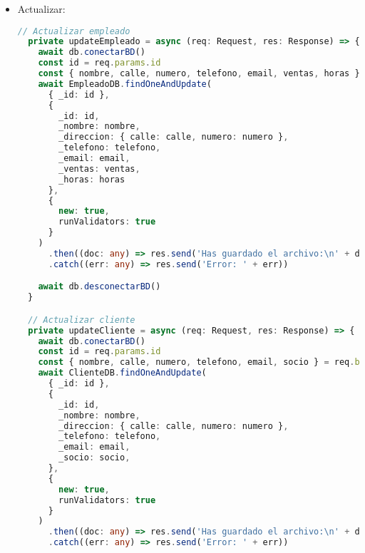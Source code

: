 \documentclass[a4paper]{article} %
\begin{document}
\begin{itemize}
\begin{lstlisting}[language=Typescript]
    db.desconectarBD()
  }

  // Add cliente:
  private addCliente = async (req: Request, res: Response) => {
    const { id, nombre, calle, numero, telefono, email, socio } = req.body
    await db.conectarBD()
    const dSchema = {
      _id: id,
      _nombre: nombre,
      _direccion: { calle: calle, numero: numero },
      _telefono: telefono,
      _email: email,
      _socio: socio
    }
    const oSchema = new ClienteDB(dSchema)
    await oSchema.save()
      .then((doc: any) => res.send('Has guardado el archivo:\n' + doc))
      .catch((err: any) => res.send('Error: ' + err))

    db.desconectarBD()
  }

  // Add compra
  private addCompra = async (req: Request, res: Response) => {
    const { id, idCliente, idProducto, coste } = req.body
    let fecha: Date = new Date()
    await db.conectarBD()
    const dSchema = {
      _id: id,
      _idCliente: idCliente,
      _idProducto: idProducto,
      _coste: coste,
      _fecha: fecha
    }
    const oSchema = new CompraDB(dSchema)
    await oSchema.save()
      .then((doc: any) => res.send('Has guardado el archivo:\n' + doc))
      .catch((err: any) => res.send('Error: ' + err))

    db.desconectarBD()
  }
\end{lstlisting}\clearpage
	\item Actualizar:
\begin{lstlisting}[language=Typescript]
	// Actualizar empleado
  private updateEmpleado = async (req: Request, res: Response) => {
    await db.conectarBD()
    const id = req.params.id
    const { nombre, calle, numero, telefono, email, ventas, horas } = req.body
    await EmpleadoDB.findOneAndUpdate(
      { _id: id },
      {
        _id: id,
        _nombre: nombre,
        _direccion: { calle: calle, numero: numero },
        _telefono: telefono,
        _email: email,
        _ventas: ventas,
        _horas: horas
      },
      {
        new: true,
        runValidators: true
      }
    )
      .then((doc: any) => res.send('Has guardado el archivo:\n' + doc))
      .catch((err: any) => res.send('Error: ' + err))

    await db.desconectarBD()
  }

  // Actualizar cliente
  private updateCliente = async (req: Request, res: Response) => {
    await db.conectarBD()
    const id = req.params.id
    const { nombre, calle, numero, telefono, email, socio } = req.body
    await ClienteDB.findOneAndUpdate(
      { _id: id },
      {
        _id: id,
        _nombre: nombre,
        _direccion: { calle: calle, numero: numero },
        _telefono: telefono,
        _email: email,
        _socio: socio,
      },
      {
        new: true,
        runValidators: true
      }
    )
      .then((doc: any) => res.send('Has guardado el archivo:\n' + doc))
      .catch((err: any) => res.send('Error: ' + err))


\end{lstlisting}
\end{itemize}
\end{document}
